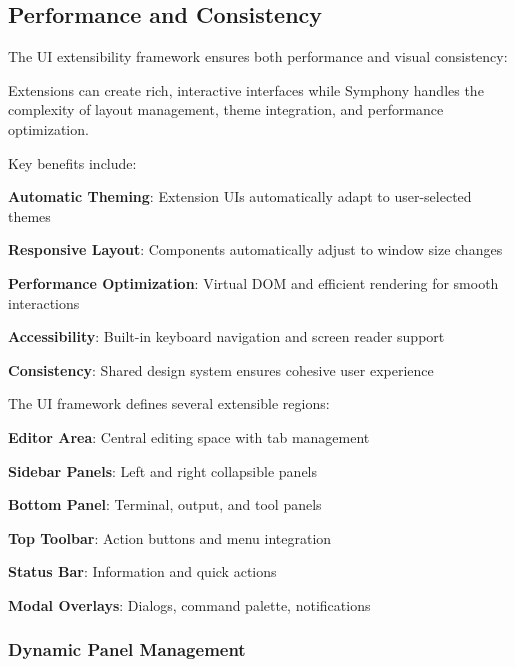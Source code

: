 \subsection*{Performance and Consistency}

The UI extensibility framework ensures both performance and visual consistency:

\begin{successbox}
Extensions can create rich, interactive interfaces while Symphony handles the complexity of layout management, theme integration, and performance optimization.
\end{successbox}

Key benefits include:

\begin{compactlist}
    \item \textbf{Automatic Theming}: Extension UIs automatically adapt to user-selected themes
    \item \textbf{Responsive Layout}: Components automatically adjust to window size changes
    \item \textbf{Performance Optimization}: Virtual DOM and efficient rendering for smooth interactions
    \item \textbf{Accessibility}: Built-in keyboard navigation and screen reader support
    \item \textbf{Consistency}: Shared design system ensures cohesive user experience
\end{compactlist}

The UI framework defines several extensible regions:

\begin{compactlist}
    \item \textbf{Editor Area}: Central editing space with tab management
    \item \textbf{Sidebar Panels}: Left and right collapsible panels
    \item \textbf{Bottom Panel}: Terminal, output, and tool panels
    \item \textbf{Top Toolbar}: Action buttons and menu integration
    \item \textbf{Status Bar}: Information and quick actions
    \item \textbf{Modal Overlays}: Dialogs, command palette, notifications
\end{compactlist}

\subsubsection*{Dynamic Panel Management}

